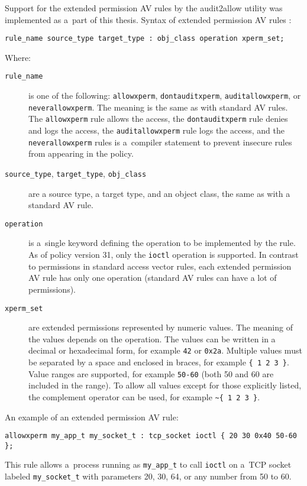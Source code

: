 Support for the extended permission AV rules by the audit2allow utility was
implemented as a~part of this thesis. Syntax of extended permission AV rules
\cite{xpermrules}:
\begin{lstlisting}[language=te]
rule_name source_type target_type : obj_class operation xperm_set;
\end{lstlisting}
Where:
\begin{description}
    \item [\texttt{rule\_name}] is one of the following: \texttt{allowxperm},
        \texttt{dontauditxperm}, \texttt{auditallowxperm}, or
        \texttt{neverallowxperm}. The meaning is the same as with standard AV
        rules. The \texttt{allowxperm} rule allows the access, the
        \texttt{dontauditxperm} rule denies and logs the access, the
        \texttt{auditallowxperm} rule logs the access, and the
        \texttt{neverallowxperm} rules is a~compiler statement to prevent
        insecure rules from appearing in the policy.
    \item [\texttt{source\_type}, \texttt{target\_type}, \texttt{obj\_class}]
        are a source type, a target type, and an object class, the same as with
        a standard AV rule.
    \item [\texttt{operation}] is a~single keyword defining the operation to be
        implemented by the rule. As of policy version 31, only the
        \texttt{ioctl} operation is supported. In contrast to permissions in
        standard access vector rules, each extended permission AV rule has only
        one operation (standard AV rules can have a lot of permissions).
    \item [\texttt{xperm\_set}] are extended permissions represented by numeric
        values. The meaning of the values depends on the operation. The values
        can be written in a decimal or hexadecimal form, for example \texttt{42}
        or \texttt{0x2a}. Multiple values must be separated by a space and
        enclosed in braces, for example \texttt{\{ 1 2 3 \}}. Value ranges are
        supported, for example \texttt{50-60} (both 50 and 60 are included in
        the range).  To allow all values except for those explicitly listed, the
        complement operator can be used, for example
        \texttt{\textasciitilde \{ 1 2 3 \}}.
\end{description}

An example of an extended permission AV rule:
\begin{lstlisting}[language=te]
allowxperm my_app_t my_socket_t : tcp_socket ioctl { 20 30 0x40 50-60 };
\end{lstlisting}
This rule allows a~process running as \texttt{my\_app\_t} to call \texttt{ioctl}
on a~TCP socket labeled \texttt{my\_socket\_t} with parameters 20, 30, 64, or
any number from 50 to 60.

